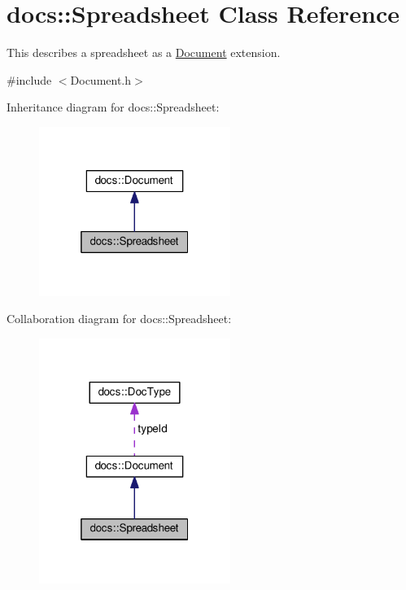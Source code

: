 \hypertarget{classdocs_1_1Spreadsheet}{\section{docs\-:\-:Spreadsheet Class Reference}
\label{classdocs_1_1Spreadsheet}
}


This describes a spreadsheet as a \hyperlink{classdocs_1_1Document}{Document} extension.  




{\ttfamily \#include $<$Document.\-h$>$}



Inheritance diagram for docs\-:\-:Spreadsheet\-:\nopagebreak
\begin{figure}[H]
\begin{center}
\leavevmode
\includegraphics[width=176pt]{classdocs_1_1Spreadsheet__inherit__graph}
\end{center}
\end{figure}


Collaboration diagram for docs\-:\-:Spreadsheet\-:
\nopagebreak
\begin{figure}[H]
\begin{center}
\leavevmode
\includegraphics[width=176pt]{classdocs_1_1Spreadsheet__coll__graph}
\end{center}
\end{figure}
